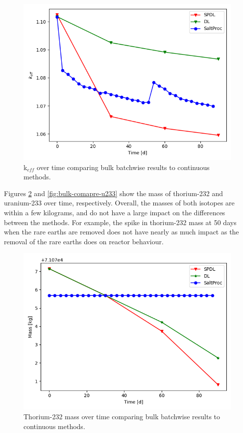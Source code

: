 \begin{figure}[H]
  \centering
  \includegraphics[scale=0.7]{images/soln-3-keff.png}
  \caption{k$_{eff}$ over time comparing bulk batchwise results to continuous methods.}
   \label{fig:bulk-comapre-keff}
\end{figure}

Figures \ref{fig:bulk-comapre-th232} and \ref{fig:bulk-comapre-u233} show the mass of thorium-232 and uranium-233 over time, respectively. Overall, the masses of both isotopes are within a few kilograms, and do not have a large impact on the differences between the methods. For example, the spike in thorium-232 mass at 50 days when the rare earths are removed does not have nearly as much impact as the removal of the rare earths does on reactor behaviour.

\begin{figure}[H]
  \centering
  \includegraphics[scale=0.7]{images/soln-3-Th232.png}
  \caption{Thorium-232 mass over time comparing bulk batchwise results to continuous methods.}
   \label{fig:bulk-comapre-th232}
\end{figure}

